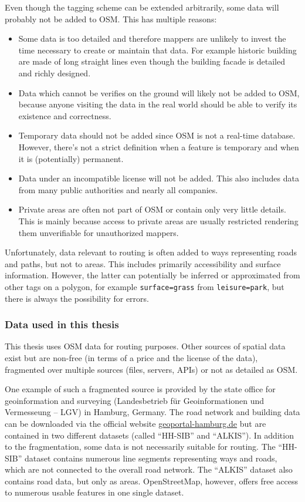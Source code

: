 			Even though the tagging scheme can be extended arbitrarily, some data will probably not be added to OSM.
			This has multiple reasons:
			
			\begin{itemize}
				\item Some data is too detailed and therefore mappers are unlikely to invest the time necessary to create or maintain that data.
				For example historic building are made of long straight lines even though the building facade is detailed and richly designed.
				\item Data which cannot be verifies on the ground will likely not be added to OSM, because anyone visiting the data in the real world should be able to verify its existence and correctness.
				\item Temporary data should not be added since OSM is not a real-time database.
				However, there's not a strict definition when a feature is temporary and when it is (potentially) permanent.
				\item Data under an incompatible license will not be added.
				This also includes data from many public authorities and nearly all companies.
				\item Private areas are often not part of OSM or contain only very little details.
				This is mainly because access to private areas are usually restricted rendering them unverifiable for unauthorized mappers.
			\end{itemize}
			Unfortunately, data relevant to routing is often added to ways representing roads and paths, but not to areas.
			This includes primarily accessibility and surface information.
			However, the latter can potentially be inferred or approximated from other tags on a polygon, for example \texttt{surface=grass} from \texttt{leisure=park}, but there is always the possibility for errors.
			
		\subsubsection{Data used in this thesis}
		
			This thesis uses OSM data for routing purposes.
			Other sources of spatial data exist but are non-free (in terms of a price and the license of the data), fragmented over multiple sources (files, servers, APIs) or not as detailed as OSM.
			
			One example of such a fragmented source is provided by the state office for geoinformation and surveying (Landesbetrieb für Geoinformationen und Vermesseung -- LGV) in Hamburg, Germany.
			The road network and building data can be downloaded via the official website \href{https://geoportal-hamburg.de}{geoportal-hamburg.de} but are contained in two different datasets (called \enquote{HH-SIB} and \enquote{ALKIS}).
			In addition to the fragmentation, some data is not necessarily suitable for routing.
			The \enquote{HH-SIB} dataset contains numerous line segments representing ways and roads, which are not connected to the overall road network.
			The \enquote{ALKIS} dataset also contains road data, but only as areas.
			OpenStreetMap, however, offers free access to numerous usable features in one single dataset.
			
